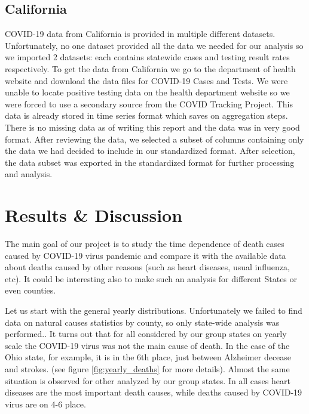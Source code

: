\documentclass[conference]{IEEEtran}
\begin{document}
\subsection{California}


COVID-19 data from California is provided in multiple different datasets.
Unfortunately, no one dataset provided all the data we needed for our analysis so we imported 2 datasets: each contains statewide cases and testing result rates respectively.
To get the data from California we go to the department of health website and download the data files for COVID-19 Cases and Tests.
We were unable to locate positive testing data on the health department website so we were forced to use a secondary source from the COVID Tracking Project.
This data is already stored in time series format which saves on aggregation steps.
There is no missing data as of writing this report and the data was in very good format. After reviewing the data, we selected a subset of columns containing only the data we had decided to include in our standardized format. After selection, the data subset was exported in the standardized format for further processing and analysis.

\section{ Results \& Discussion }

The main goal of our project is to study the time dependence of death cases caused by COVID-19 virus pandemic and compare it with the available data about deaths caused by other reasons (such as heart diseases, usual influenza, etc). It could be interesting also to make such an analysis for different States or even counties.

Let us start with the general yearly distributions. Unfortunately we failed to find data on natural causes statistics by county, so only state-wide analysis was performed.. It turns out that for all considered by our group states on yearly scale the COVID-19 virus was not the main cause of death. In the case of the Ohio state, for example, it is in the 6th place, just between Alzheimer decease and strokes. (see figure \ref{fig:yearly_deaths} for more details). Almost the same situation is observed for other analyzed by our group states. In all cases heart diseases are the most important death causes, while deaths caused by COVID-19 virus are on 4-6 place.
\end{document}
